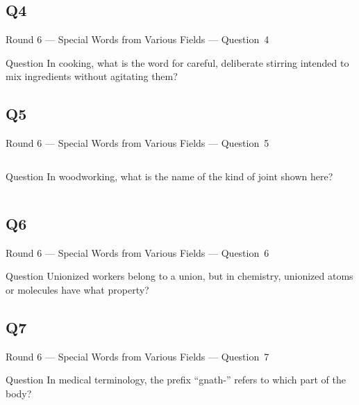 \documentclass[11pt]{beamer}
\begin{document}
\subsection*{Q4}
\begin{frame}[t]{Round 6 --- Special Words from Various Fields --- \mbox{Question 4}}
\vspace{-0.5em}
\begin{block}{Question}
In cooking, what is the word for careful, deliberate stirring intended to mix ingredients without agitating them?
\end{block}
\end{frame}
\subsection*{Q5}
\begin{frame}[t]{Round 6 --- Special Words from Various Fields --- \mbox{Question 5}}
\vspace{-0.5em}
\begin{columns}[T,totalwidth=\linewidth]
\begin{column}{0.32\linewidth}
\begin{block}{Question}
In woodworking, what is the name of the kind of joint shown here?
\end{block}
\end{column}
\begin{column}{0.65\linewidth}
\begin{center}
\texttt{[image: \{Images/dovetail]}.jpg}
\end{center}
\end{column}
\end{columns}
\end{frame}
\subsection*{Q6}
\begin{frame}[t]{Round 6 --- Special Words from Various Fields --- \mbox{Question 6}}
\vspace{-0.5em}
\begin{block}{Question}
Unionized workers belong to a union, but in chemistry, unionized atoms or molecules have what property?
\end{block}
\end{frame}
\subsection*{Q7}
\begin{frame}[t]{Round 6 --- Special Words from Various Fields --- \mbox{Question 7}}
\vspace{-0.5em}
\begin{block}{Question}
In medical terminology, the prefix ``gnath-'' refers to which part of the body?
\end{block}
\end{frame}
\end{document}
